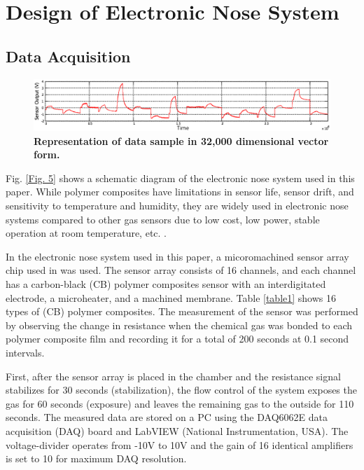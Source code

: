 \documentclass[10pt,letterpaper]{article}
\begin{document}
\section*{Design of Electronic Nose System}
\subsection*{Data Acquisition}
\begin{figure}[t]
	\centering
    \includegraphics[width=1\textwidth]{_6.eps}
    \caption{\bf{Representation of data sample in 32,000 dimensional vector form.}\label{Fig. 6}}
\end{figure}

Fig. \ref{Fig. 5} shows a schematic diagram of the electronic nose system used in this paper.
While polymer composites have limitations in sensor life, sensor drift, and sensitivity to temperature and humidity, they are widely used in electronic nose systems compared to other gas sensors due to low cost, low power, stable operation at room temperature, etc. \cite{choi2014discriminant,wang2007reconstruction,vergara2012chemical}. 

In the electronic nose system used in this paper, a micoromachined sensor array chip used in \cite{wang2007reconstruction} was used. 
The sensor array consists of 16 channels, and each channel has a carbon-black (CB) polymer composites sensor with an interdigitated electrode, a microheater, and a machined membrane. Table \ref{table1} shows 16 types of (CB) polymer composites. 
The measurement of the sensor was performed by observing the change in resistance when the chemical gas was bonded to each polymer composite film and recording it for a total of 200 seconds at 0.1 second intervals.

First, after the sensor array is placed in the chamber and the resistance signal stabilizes for 30 seconds (stabilization), the flow control of the system exposes the gas for 60 seconds (exposure) and leaves the remaining gas to the outside for 110 seconds\cite{ha2005integrated}. The measured data are stored on a PC using the DAQ6062E data acquisition (DAQ) board and LabVIEW (National Instrumentation, USA). The voltage-divider operates from -10V to 10V and the gain of 16 identical amplifiers is set to 10 for maximum DAQ resolution\cite{yang2005matched}.
\end{document}

